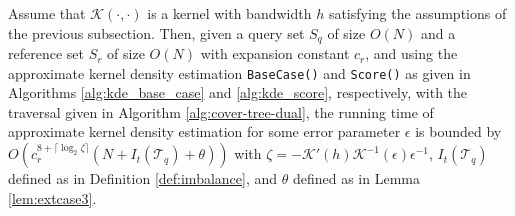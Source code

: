 \begin{thm}
Assume that $\mathcal{K}(\cdot, \cdot)$ is a kernel with bandwidth $h$ satisfying the assumptions
of the previous subsection.  Then, given a query set $S_q$ of size $O(N)$ and a
reference set $S_r$ of size $O(N)$ with expansion constant $c_r$, and using the
approximate kernel density estimation \texttt{BaseCase()} and \texttt{Score()}
as given in Algorithms \ref{alg:kde_base_case} and \ref{alg:kde_score},
respectively, with the traversal given in Algorithm \ref{alg:cover-tree-dual},
the running time of approximate kernel density estimation for some error
parameter $\epsilon$ is bounded by
$O(c_r^{8 + \lceil \log_2 \zeta \rceil} (N + I_t(\mathscr{T}_q) + \theta))$
with $\zeta = -\mathcal{K}'(h) \mathcal{K}^{-1}(\epsilon) \epsilon^{-1}$,
$I_t(\mathscr{T}_q)$ defined as in Definition \ref{def:imbalance}, and $\theta$
defined as in Lemma \ref{lem:extcase3}.

\label{thm:kde-bound}
\end{thm}

